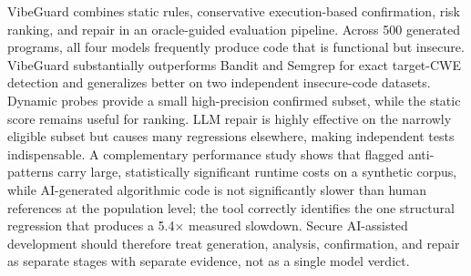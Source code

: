 \documentclass[sigconf,nonacm]{acmart}
\begin{document}
VibeGuard combines static rules, conservative execution-based confirmation,
risk ranking, and repair in an oracle-guided evaluation pipeline. Across 500
generated programs, all four models frequently produce code that is functional
but insecure. VibeGuard substantially outperforms Bandit and Semgrep for exact
target-CWE detection and generalizes better on two independent insecure-code
datasets. Dynamic probes provide a small high-precision confirmed subset, while
the static score remains useful for ranking. LLM repair is highly effective on
the narrowly eligible subset but causes many regressions elsewhere, making
independent tests indispensable. A complementary performance study shows that
flagged anti-patterns carry large, statistically significant runtime costs on a
synthetic corpus, while AI-generated algorithmic code is not significantly
slower than human references at the population level; the tool correctly
identifies the one structural regression that produces a 5.4$\times$ measured
slowdown. Secure AI-assisted development should therefore treat generation,
analysis, confirmation, and repair as separate stages with separate evidence,
not as a single model verdict.



\end{document}
